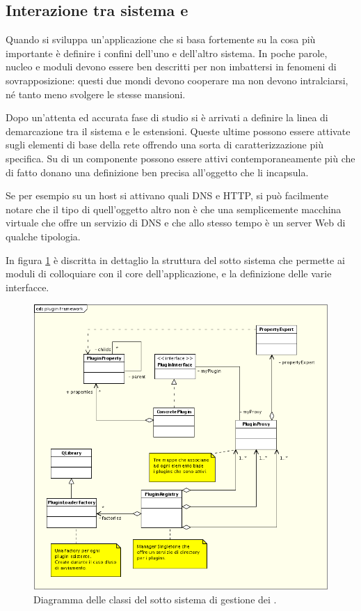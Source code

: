 \subsection{Interazione tra sistema e \plugin{}}
Quando si sviluppa un'applicazione che si basa fortemente su \plugin{} la cosa più importante è definire i confini dell'uno e dell'altro sistema. In poche parole, nucleo e moduli devono essere ben descritti per non imbattersi in fenomeni di sovrapposizione: questi due mondi devono cooperare ma non devono intralciarsi, né tanto meno svolgere le stesse mansioni.

Dopo un'attenta ed accurata fase di studio si è arrivati a definire la linea di demarcazione tra il sistema e le estensioni. Queste ultime possono essere attivate sugli elementi di base della rete offrendo una sorta di caratterizzazione più specifica. Su di un componente possono essere attivi contemporaneamente più \plugin{} che di fatto donano una definizione ben precisa all'oggetto che li incapsula.

Se per esempio su un host si attivano \plugin{} quali DNS e HTTP, si può facilmente notare che il tipo di quell'oggetto altro non è che una semplicemente macchina virtuale che offre un servizio di DNS e che allo stesso tempo è un server Web di qualche tipologia.

In figura \ref{figura:uml_plugin_framework} è discritta in dettaglio la struttura del sotto sistema che permette ai moduli di colloquiare con il core dell'applicazione, e la definizione delle varie interfacce.

\begin{figure}[!htb]
	\centering
	\includegraphics[width=12cm]{images/plugin_framework_uml.png}
	\caption{Diagramma delle classi del sotto sistema di gestione dei \plugin{}.}
	\label{figura:uml_plugin_framework}
\end{figure}

